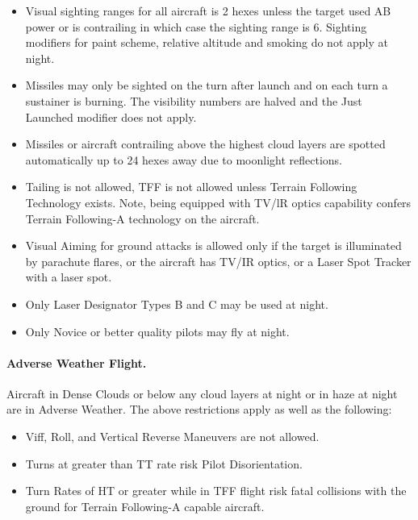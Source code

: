 \begin{advancedrules}
\begin{itemize}
    \item Visual sighting ranges for all aircraft is 2 hexes unless the target used AB power or is contrailing in which case the sighting range is 6. Sighting modifiers for paint scheme, relative altitude and smoking do not apply at night.

    \item Missiles may only be sighted on the turn after launch and on each turn a sustainer is burning. The visibility numbers are halved and the Just Launched modifier does not apply.

    \item Missiles or aircraft contrailing above the highest cloud layers are spotted automatically up to 24 hexes away due to moonlight reflections.

    \item Tailing is not allowed, TFF is not allowed unless Terrain Following Technology exists. Note, being equipped with TV/lR optics capability confers Terrain Following-A technology on the aircraft.

    \item Visual Aiming for ground attacks is allowed only if the target is illuminated by parachute flares, or the aircraft has TV/IR optics, or a Laser Spot Tracker with a laser spot.

    \item Only Laser Designator Types B and C may be used at night.

    \item Only Novice or better quality pilots may fly at night.

\end{itemize}

\paragraph{Adverse Weather Flight.} Aircraft in Dense Clouds or below any cloud layers at night or in haze at night are in Adverse Weather. The above restrictions apply as well as the following:

\begin{itemize}

    \item Viff, Roll, and Vertical Reverse Maneuvers are not allowed.

    \item Turns at greater than TT rate risk Pilot Disorientation.

    \item Turn Rates of HT or greater while in TFF flight risk fatal collisions with the ground for Terrain Following-A capable aircraft.  


\end{itemize}
\end{advancedrules}
